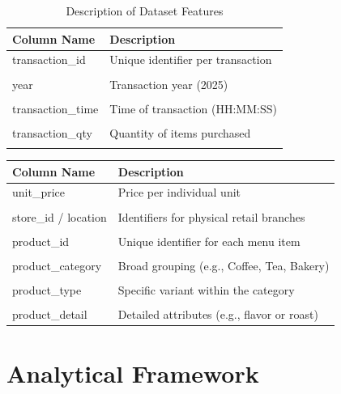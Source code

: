 \documentclass[12pt, a4paper]{article}
\begin{document}
	\begin{table}[H]
		\centering
		\caption{Description of Dataset Features}
		\label{tab:dataset}
		\begin{tabular}{@{}ll@{}}
			\toprule
			\textbf{Column Name} & \textbf{Description} \\ \midrule
			transaction\_id & Unique identifier per transaction \\ \\
			year & Transaction year (2025) \\ \\
			transaction\_time & Time of transaction (HH:MM:SS) \\ \\
			transaction\_qty & Quantity of items purchased \\ \\
			
			 \bottomrule
		\end{tabular}
	\end{table}
	\begin{table}[H]
		\centering
		\begin{tabular}{@{}ll@{}}
			\toprule
			\textbf{Column Name} & \textbf{Description} \\ \midrule
            unit\_price & Price per individual unit \\ \\
            store\_id / location & Identifiers for physical retail branches \\ \\
			product\_id & Unique identifier for each menu item \\ \\
			product\_category & Broad grouping (e.g., Coffee, Tea, Bakery) \\ \\
			product\_type & Specific variant within the category \\ \\
			product\_detail & Detailed attributes (e.g., flavor or roast) \\ \bottomrule
		\end{tabular}
		
	\end{table}
	
	\section{Analytical Framework}
	
\end{document}
